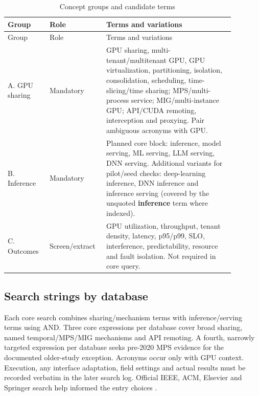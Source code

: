\documentclass[12pt,a4paper]{article}
\newcommand{\term}[1]{\textbf{#1}}
\begin{document}
\begin{longtable}{p{0.17\linewidth}p{0.19\linewidth}p{0.52\linewidth}}
\caption{Concept groups and candidate terms}\label{tab:keywords}\\\toprule Group & Role & Terms and variations\\\midrule\endfirsthead
\toprule Group & Role & Terms and variations\\\midrule\endhead
A. GPU sharing & Mandatory & GPU sharing, multi-tenant/multitenant GPU, GPU virtualization, partitioning, isolation, consolidation, scheduling, time-slicing/time sharing; MPS/multi-process service; MIG/multi-instance GPU; API/CUDA remoting, interception and proxying. Pair ambiguous acronyms with GPU.\\
B. Inference & Mandatory & Planned core block: inference, model serving, ML serving, LLM serving, DNN serving. Additional variants for pilot/seed checks: deep-learning inference, DNN inference and inference serving (covered by the unquoted \term{inference} term where indexed).\\
C. Outcomes & Screen/extract & GPU utilization, throughput, tenant density, latency, p95/p99, SLO, interference, predictability, resource and fault isolation. Not required in core query.\\\bottomrule
\end{longtable}

\subsection{Search strings by database}
Each core search combines sharing/mechanism terms with inference/serving terms using AND. Three core expressions per database cover broad sharing, named temporal/MPS/MIG mechanisms and API remoting. A fourth, narrowly targeted expression per database seeks pre-2020 MPS evidence for the documented older-study exception. Acronyms occur only with GPU context. Execution, any interface adaptation, field settings and actual results must be recorded verbatim in the later search log. Official IEEE, ACM, Elsevier and Springer search help informed the entry choices \cite{ieeeSearch,acmSearch,elsevierSearch,springerSearch}.


\end{document}
